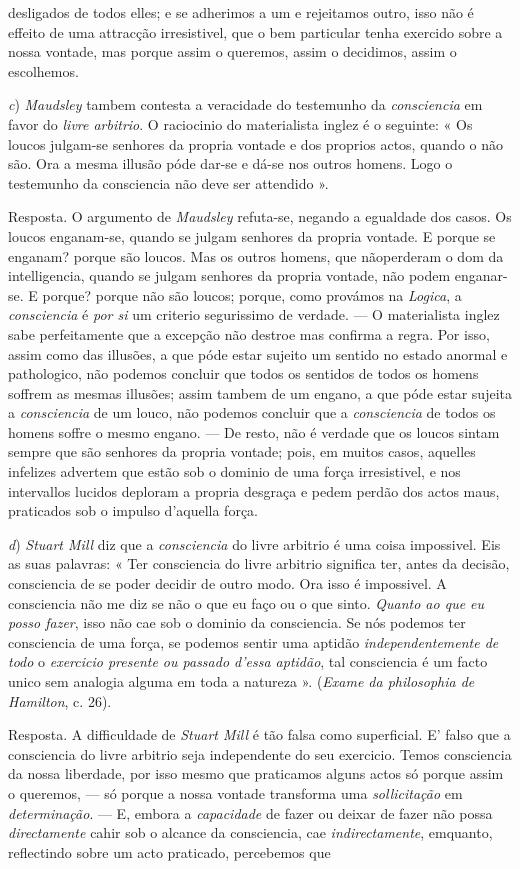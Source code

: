 desligados de todos elles; e se adherimos a um e rejeitamos outro, isso não é effeito de uma attracção irresistivel, que o bem particular tenha exercido sobre a nossa vontade, mas porque assim o queremos, assim o decidimos, assim o escolhemos.\par \emph{c}) \emph{Maudsley} tambem contesta a veracidade do testemunho da \emph{consciencia} em favor do \emph{livre arbitrio}. O raciocinio do materialista inglez é o seguinte: « Os loucos julgam-se senhores da propria vontade e dos proprios actos, quando o não são. Ora a mesma illusão póde dar-se e dá-se nos outros homens. Logo o testemunho da consciencia não deve ser attendido ».\par Resposta. O argumento de \emph{Maudsley} refuta-se, negando a egualdade dos casos. Os loucos enganam-se, quando se julgam senhores da propria vontade. E porque se enganam? porque são loucos. Mas os outros homens, que nãoperderam o dom da intelligencia, quando se julgam senhores da propria vontade, não podem enganar-se. E porque? porque não são loucos; porque, como provámos na \emph{Logica}, a \emph{consciencia} é \emph{por si} um criterio segurissimo de verdade. --- O materialista inglez sabe perfeitamente que a excepção não destroe mas confirma a regra. Por isso, assim como das illusões, a que póde estar sujeito um sentido no estado anormal e pathologico, não podemos concluir que todos os sentidos de todos os homens soffrem as mesmas illusões; assim tambem de um engano, a que póde estar sujeita a \emph{consciencia} de um louco, não podemos concluir que a \emph{consciencia} de todos os homens soffre o mesmo engano. --- De resto, não é verdade que os loucos sintam sempre que são senhores da propria vontade; pois, em muitos casos, aquelles infelizes advertem que estão sob o dominio de uma força irresistivel, e nos intervallos lucidos deploram a propria desgraça e pedem perdão dos actos maus, praticados sob o impulso d'aquella força.\par \emph{d}) \emph{Stuart Mill} diz que a \emph{consciencia} do livre arbitrio é uma coisa impossivel. Eis as suas palavras: « Ter consciencia do livre arbitrio significa ter, antes da decisão, consciencia de se poder decidir de outro modo. Ora isso é impossivel. A consciencia não me diz se não o que eu faço ou o que sinto. \emph{Quanto ao que eu posso fazer}, isso não cae sob o dominio da consciencia. Se nós podemos ter consciencia de uma força, se podemos sentir uma aptidão \emph{independentemente de todo} o \emph{exercicio presente ou passado d'essa aptidão}, tal consciencia é um facto unico sem analogia alguma em toda a natureza ». (\emph{Exame da philosophia de Hamilton}, c. 26).\par Resposta. A difficuldade de \emph{Stuart Mill} é tão falsa como superficial. E' falso que a consciencia do livre arbitrio seja independente do seu exercicio. Temos consciencia da nossa liberdade, por isso mesmo que praticamos alguns actos só porque assim o queremos, --- só porque a nossa vontade transforma uma \emph{sollicitação} em \emph{determinação}. --- E, embora a \emph{capacidade} de fazer ou deixar de fazer não possa \emph{directamente} cahir sob o alcance da consciencia, cae \emph{indirectamente}, emquanto, reflectindo sobre um acto praticado, percebemos que 